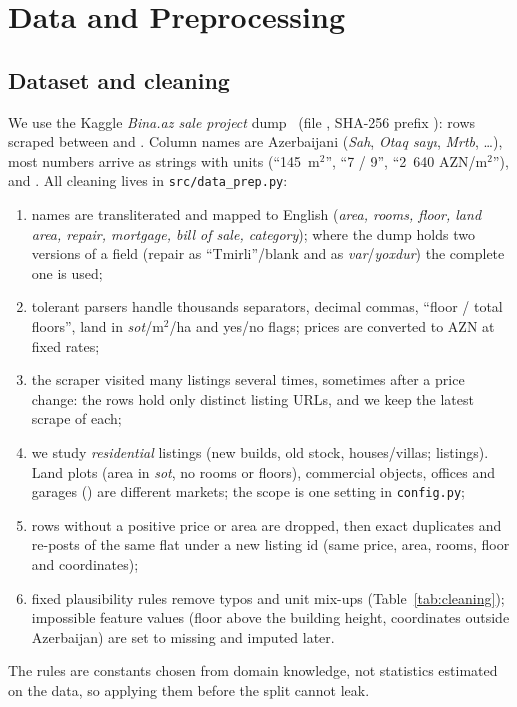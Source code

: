 \documentclass[10pt,twocolumn,a4paper]{article}
\newcommand{\schwa}{\raisebox{0.13ex}{\rotatebox[origin=c]{180}{e}}}  %
\begin{document}
\section{Data and Preprocessing}
\subsection{Dataset and cleaning}
We use the Kaggle \emph{Bina.az sale project} dump~\cite{data} (file
\texttt{\DataFile}, SHA-256 prefix \texttt{\DataSHA}): \NRaw{} rows scraped
between \ScrapeStart{} and \ScrapeEnd. Column names are Azerbaijani
(\emph{Sah\schwa{}}, \emph{Otaq say\i}, \emph{M\schwa{}rt\schwa{}b\schwa{}},
\ldots), most numbers arrive as strings with units (``145~m$^2$'', ``7 / 9'',
``2~640 AZN/m$^2$''), and \CurrencySentence. All cleaning lives in \texttt{src/data\_prep.py}:
\begin{enumerate}\setlength\itemsep{0pt}
  \item names are transliterated and mapped to English (\emph{area, rooms,
        floor, land area, repair, mortgage, bill of sale, category}); where the
        dump holds two versions of a field (repair as ``T\schwa{}mirli''/blank and
        as \emph{var}/\emph{yoxdur}) the complete one is used;
  \item tolerant parsers handle thousands separators, decimal commas,
        ``floor / total floors'', land in \emph{sot}/m$^2$/ha and yes/no flags;
        prices are converted to AZN at fixed rates;
  \item the scraper visited many listings several times, sometimes after a
        price change: the \NRaw{} rows hold only \NUniqueListings{} distinct
        listing URLs, and we keep the latest scrape of each;
  \item we study \emph{residential} listings (new builds, old stock,
        houses/villas; \NResidential{} listings). Land plots (area in
        \emph{sot}, no rooms or floors), commercial objects, offices and
        garages (\ScopeDroppedCats) are different markets; the scope is one
        setting in \texttt{config.py};
  \item rows without a positive price or area are dropped, then exact
        duplicates and re-posts of the same flat under a new listing id (same
        price, area, rooms, floor and coordinates);
  \item fixed plausibility rules remove typos and unit mix-ups
        (Table~\ref{tab:cleaning}); impossible feature values (floor above the
        building height, coordinates outside Azerbaijan) are set to missing and
        imputed later.
\end{enumerate}
The rules are constants chosen from domain knowledge, not statistics
estimated on the data, so applying them before the split cannot leak.
\end{document}
